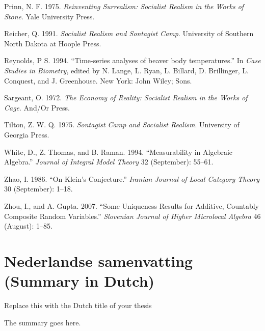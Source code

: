 \documentclass[10pt,english,]{book} %
\newenvironment{dutch}[2][]{\begin{otherlanguage}{dutch}}{\end{otherlanguage}}
\theoremstyle{definition}
\theoremstyle{definition}
\theoremstyle{definition}
\theoremstyle{definition}
\theoremstyle{remark}
\begin{document}
\leavevmode\hypertarget{ref-Prinn1975}{}%
Prinn, N. F. 1975. \emph{Reinventing Surrealism: Socialist Realism in the Works of Stone}. Yale University Press.

\leavevmode\hypertarget{ref-Reicher1991}{}%
Reicher, Q. 1991. \emph{Socialist Realism and Sontagist Camp}. University of Southern North Dakota at Hoople Press.

\leavevmode\hypertarget{ref-Reynolds1994}{}%
Reynolds, P S. 1994. ``Time-series analyses of beaver body temperatures.'' In \emph{Case Studies in Biometry}, edited by N. Lange, L. Ryan, L. Billard, D. Brillinger, L. Conquest, and J. Greenhouse. New York: John Wiley; Sons.

\leavevmode\hypertarget{ref-Sargeant1972}{}%
Sargeant, O. 1972. \emph{The Economy of Reality: Socialist Realism in the Works of Cage}. And/Or Press.

\leavevmode\hypertarget{ref-Tilton1975}{}%
Tilton, Z. W. Q. 1975. \emph{Sontagist Camp and Socialist Realism}. University of Georgia Press.

\leavevmode\hypertarget{ref-White1994}{}%
White, D., Z. Thomas, and B. Raman. 1994. ``Measurability in Algebraic Algebra.'' \emph{Journal of Integral Model Theory} 32 (September): 55--61.

\leavevmode\hypertarget{ref-Zhao1986}{}%
Zhao, I. 1986. ``On Klein's Conjecture.'' \emph{Iranian Journal of Local Category Theory} 30 (September): 1--18.

\leavevmode\hypertarget{ref-Zhou2007}{}%
Zhou, I., and A. Gupta. 2007. ``Some Uniqueness Results for Additive, Countably Composite Random Variables.'' \emph{Slovenian Journal of Higher Microlocal Algebra} 46 (August): 1--85.

\endgroup

\hypertarget{nederlandse-samenvatting-summary-in-dutch}{%
\chapter*{Nederlandse samenvatting (Summary in Dutch)}\label{nederlandse-samenvatting-summary-in-dutch}}


\begin{dutch}

\emph{Replace this with the Dutch title of your thesis}

\bigskip

The summary goes here.

\end{dutch}
\end{document}
